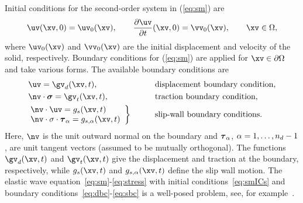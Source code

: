 \documentclass[11pt]{article}
\begin{document}
% 
Initial conditions for the second-order system in (\ref{eq:sm}) are
\begin{equation}
\uv(\xv,0)=\uv_0(\xv),\qquad {\partial\uv\over\partial t}(\xv,0)=\vv_0(\xv),\qquad \xv\in\Omega,
\label{eq:smICs}
\end{equation}
where $\uv_0(\xv)$ and $\vv_0(\xv)$ are the initial displacement and velocity of
the solid, respectively.  Boundary conditions for (\ref{eq:sm}) are applied
for $\xv\in\partial\Omega$ and take various forms.  The available boundary conditions
are
\begin{alignat}{3}
& \uv=\gv_d(\xv,t),                  \quad && \hbox{displacement boundary condition}, \label{eq:dbc} \\
& \nv\cdot\sigmav =\gv_t(\xv,t),     \quad && \hbox{traction boundary condition},  \label{eq:tbc}  \\
& \!\!\!
    \left.\begin{array}{l}
        \nv\cdot\uv=g_s(\xv,t)  \\
           \nv\cdot\s\cdot\tnv_\alpha=g_{s,\alpha}(\xv,t) 
        \end{array}\right\}                       \qquad&& \hbox{slip-wall boundary conditions}.  \label{eq:sbc} 
\end{alignat}
Here, $\nv$ is the unit outward normal on the boundary and
$\boldsymbol{\tau}_\alpha$, $\alpha=1,\ldots,{n_d}-1$, are unit tangent vectors (assumed to be mutually orthogonal).  The functions
$\gv_d(\xv,t)$ and $\gv_t(\xv,t)$ give the displacement and traction at the
boundary, respectively, while $g_s(\xv,t)$ and $g_{s,\alpha}(\xv,t)$ define the slip wall motion.
The elastic wave equation~\eqref{eq:sm}-\eqref{eq:stress} with initial conditions~\eqref{eq:smICs} and
boundary conditions~\eqref{eq:dbc}-\eqref{eq:sbc} is a well-posed problem, see, for example~\cite{Graff1991}.

\end{document}

